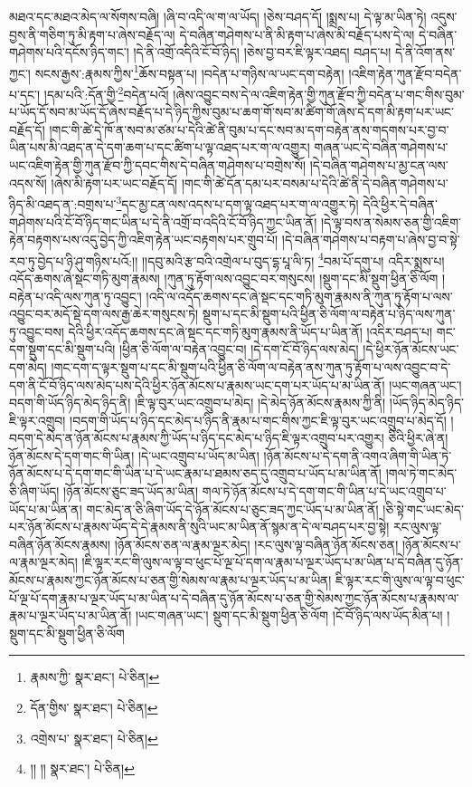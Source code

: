མཐའ་དང་མཐའ་མེད་ལ་སོགས་བཞི། །ཞི་བ་འདི་ལ་ག་ལ་ཡོད། །ཅེས་བཤད་དོ། །སྨྲས་པ། དེ་ལྟ་མ་ཡིན་ཏེ། འདུས་བྱས་ནི་གཅིག་ཏུ་མི་རྟག་པ་ཞེས་བརྗོད་ལ། དེ་བཞིན་གཤེགས་པ་ནི་མི་རྟག་པ་ཞེས་མི་བརྗོད་པས་དེ་ལ། དེ་བཞིན་གཤེགས་པའི་དངོས་ཉིད་གང་། །དེ་ནི་འགྲོ་འདིའི་ངོ་བོ་ཉིད། །ཅེས་བྱ་བར་ཇི་ལྟར་འཐད། བཤད་པ། དེ་ནི་འོག་ནས་ཀྱང་། སངས་རྒྱས་:རྣམས་ཀྱིས་\footnote{རྣམས་ཀྱི་  སྣར་ཐང་།  པེ་ཅིན། }ཆོས་བསྟན་པ། །བདེན་པ་གཉིས་ལ་ཡང་དག་བརྟེན། །འཇིག་རྟེན་ཀུན་རྫོབ་བདེན་པ་དང་། །དམ་པའི་:དོན་གྱི་\footnote{དོན་གྱིས་  སྣར་ཐང་།  པེ་ཅིན། }བདེན་པའོ། །ཞེས་འབྱུང་བས་དེ་ལ་འཇིག་རྟེན་གྱི་ཀུན་རྫོབ་ཀྱི་བདེན་པ་གང་གིས་བུམ་པ་ཡོད་དོ་སབ་མ་ཡོད་དོ་ཞེས་བརྗོད་པ་དེ་ཉིད་ཀྱིས་བུམ་པ་ཆག་གོ་སབ་མ་ཚིག་གོ་ཞེས་དེ་དག་མི་རྟག་པར་ཡང་བརྗོད་དོ། །གང་གི་ཚེ་དེ་ཁོ་ན་སབ་མ་ཙམ་པ་དེའི་ཚེ་ནི་བུམ་པ་དང་སབ་མ་དག་བརྟེན་ནས་གདགས་པར་བྱ་བ་ཡིན་པས་མི་འཐད་ན་དེ་དག་ཆག་པ་དང་ཚིག་པ་ལྟ་འཐད་པར་ག་ལ་འགྱུར། གཞན་ཡང་དེ་བཞིན་གཤེགས་པ་ཡང་འཇིག་རྟེན་གྱི་ཀུན་རྫོབ་ཀྱི་དབང་གིས་དེ་བཞིན་གཤེགས་པ་བགྲེས་སོ། །དེ་བཞིན་གཤེགས་པ་མྱ་ངན་ལས་འདས་སོ། །ཞེས་མི་རྟག་པར་ཡང་བརྗོད་དོ། །གང་གི་ཚེ་དོན་དམ་པར་བསམ་པ་དེའི་ཚེ་ནི་དེ་བཞིན་གཤེགས་པ་ཉིད་མི་འཐད་ན་:བགྲས་པ་\footnote{འགྲེས་པ་  སྣར་ཐང་།  པེ་ཅིན། }དང་མྱ་ངན་ལས་འདས་པ་དག་ལྟ་འཐད་པར་ག་ལ་འགྱུར་ཏེ། དེའི་ཕྱིར་དེ་བཞིན་གཤེགས་པའི་ངོ་བོ་ཉིད་གང་ཡིན་པ་དེ་ནི་འགྲོ་བ་འདིའི་ངོ་བོ་ཉིད་ཀྱང་ཡིན་ནོ། །དེ་ལྟ་བས་ན་སེམས་ཅན་གྱི་འཇིག་རྟེན་བརྟགས་པས་འདུ་བྱེད་ཀྱི་འཇིག་རྟེན་ཡང་བརྟགས་པར་གྲུབ་པོ། །དེ་བཞིན་གཤེགས་པ་བརྟག་པ་ཞེས་བྱ་བ་སྟེ་རབ་ཏུ་བྱེད་པ་ཉི་ཤུ་གཉིས་པའོ:།། །།དབུ་མའི་རྩ་བའི་འགྲེལ་པ་བུད་དྷ་པཱ་ལི་ཏ། \footnote{།། །།   སྣར་ཐང་།  པེ་ཅིན། }བམ་པོ་དགུ་པ། འདིར་སྨྲས་པ། འདོད་ཆགས་ཞེ་སྡང་གཏི་མུག་རྣམས། །ཀུན་ཏུ་རྟོག་ལས་འབྱུང་བར་གསུངས། །སྡུག་དང་མི་སྡུག་ཕྱིན་ཅི་ལོག །བརྟེན་པ་འདི་ལས་ཀུན་ཏུ་འབྱུང་། །འདི་ལ་འདོད་ཆགས་དང་ཞེ་སྡང་དང་གཏི་མུག་རྣམས་ནི་ཀུན་ཏུ་རྟོག་པ་ལས་འབྱུང་བར་མདོ་སྡེ་དག་ལས་རྒྱ་ཆེར་གསུངས་ཏེ། སྡུག་པ་དང་མི་སྡུག་པའི་ཕྱིན་ཅི་ལོག་ལ་བརྟེན་པ་ཉིད་ལས་ཀུན་ཏུ་འབྱུང་བས། དེའི་ཕྱིར་འདོད་ཆགས་དང་ཞེ་སྡང་དང་གཏི་མུག་རྣམས་ནི་ཡོད་པ་ཡིན་ནོ། །འདིར་བཤད་པ། གང་དག་སྡུག་དང་མི་སྡུག་པའི། །ཕྱིན་ཅི་ལོག་ལ་བརྟེན་འབྱུང་བ། །དེ་དག་ངོ་བོ་ཉིད་ལས་མེད། །དེ་ཕྱིར་ཉོན་མོངས་ཡང་དག་མེད། །གང་དག་ད་ལྟར་སྡུག་པ་དང་མི་སྡུག་པའི་ཕྱིན་ཅི་ལོག་ལ་བརྟེན་ནས་ཀུན་ཏུ་རྟོག་པ་ལས་འབྱུང་བ་དེ་དག་ནི་ངོ་བོ་ཉིད་ལས་མེད་པས་དེའི་ཕྱིར་ཉོན་མོངས་པ་རྣམས་ཡང་དག་པར་ཡོད་པ་མ་ཡིན་ནོ། །ཡང་གཞན་ཡང་། བདག་གི་ཡོད་ཉིད་མེད་ཉིད་ནི། །ཇི་ལྟ་བུར་ཡང་འགྲུབ་པ་མེད། །དེ་མེད་ཉོན་མོངས་རྣམས་ཀྱི་ནི། །ཡོད་ཉིད་མེད་ཉིད་ཇི་ལྟར་འགྲུབ། །བདག་གི་ཡོད་པ་ཉིད་དང་མེད་པ་ཉིད་ནི་རྣམ་པ་གང་གིས་ཀྱང་ཇི་ལྟ་བུར་ཡང་འགྲུབ་པ་མེད་དོ། །བདག་དེ་མེད་ན་ཉོན་མོངས་པ་རྣམས་ཀྱི་ཡོད་པ་ཉིད་དང་མེད་པ་ཉིད་ཇི་ལྟར་འགྲུབ་པར་འགྱུར། ཅིའི་ཕྱིར་ཞེ་ན། ཉོན་མོངས་དེ་དག་གང་གི་ཡིན། །དེ་ཡང་འགྲུབ་པ་ཡོད་མ་ཡིན། །ཉོན་མོངས་པ་དེ་དག་ནི་འགའ་ཞིག་གི་ཡིན་ཏེ་ཉོན་མོངས་པ་དེ་དག་གང་གི་ཡིན་པ་དེ་ཡང་རྣམ་པ་ཐམས་ཅད་དུ་འགྲུབ་པ་ཡོད་པ་མ་ཡིན་ནོ། །གལ་ཏེ་གང་མེད་ཅི་ཞིག་ཡོད། །ཉོན་མོངས་ཅུང་ཟད་ཡོད་མ་ཡིན། གལ་ཏེ་ཉོན་མོངས་པ་དེ་དག་གང་གི་ཡིན་པ་དེ་ཡང་འགྲུབ་པ་ཡོད་པ་མ་ཡིན་ན། གང་མེད་ན་ཅི་ཞིག་ཡོད་དེ་ཉོན་མོངས་པ་ཅུང་ཟད་ཀྱང་ཡོད་པ་མ་ཡིན་ནོ། །ཅི་སྟེ་གང་ཡང་མེད་པར་ཉོན་མོངས་པ་རྣམས་ཡོད་དེ་དེ་རྣམས་ནི་སུའི་ཡང་མ་ཡིན་ནོ་སྙམ་ན་དེ་ལ་བཤད་པར་བྱ་སྟེ། རང་ལུས་ལྟ་བཞིན་ཉོན་མོངས་རྣམས། །ཉོན་མོངས་ཅན་ལ་རྣམ་ལྔར་མེད། །རང་ལུས་ལྟ་བཞིན་ཉོན་མོངས་ཅན། །ཉོན་མོངས་པ་ལ་རྣམ་ལྔར་མེད། །ཇི་ལྟར་རང་གི་ལུས་ལ་ལྟ་བ་ཕུང་པོ་ལྔ་པོ་དག་ལ་རྣམ་པ་ལྔར་ཡོད་པ་མ་ཡིན་པ་དེ་བཞིན་དུ་ཉོན་མོངས་པ་རྣམས་ཀྱང་ཉོན་མོངས་པ་ཅན་གྱི་སེམས་ལ་རྣམ་པ་ལྔར་ཡོད་པ་མ་ཡིན། ཇི་ལྟར་རང་གི་ལུས་ལ་ལྟ་བ་ཕུང་པོ་ལྔ་པོ་དག་རྣམ་པ་ལྔར་ཡོད་པ་མ་ཡིན་པ་དེ་བཞིན་དུ་ཉོན་མོངས་པ་ཅན་གྱི་སེམས་ཀྱང་ཉོན་མོངས་པ་རྣམས་ལ་རྣམ་པ་ལྔར་ཡོད་པ་མ་ཡིན་ནོ། །ཡང་གཞན་ཡང་། སྡུག་དང་མི་སྡུག་ཕྱིན་ཅི་ལོག །ངོ་བོ་ཉིད་ལས་ཡོད་མིན་པ། །སྡུག་དང་མི་སྡུག་ཕྱིན་ཅི་ལོག 